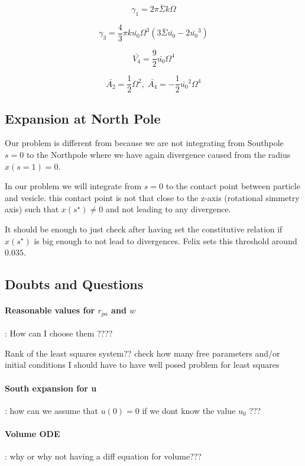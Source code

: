 \documentclass[12pt]{article}
\begin{document}
$$
\gamma_1 = 2 \pi \bar{\Sigma} k \Omega 
$$

$$
\gamma_3 = \frac{4}{3} \pi k \bar{u_0} \Omega^3 (3 \bar{\Sigma} \bar{u_0} - 2 \bar{u_0}^3)
$$


$$
\bar{V_4} = \frac{9}{2}\bar{u_0} \Omega^4
$$

$$
\bar{A_2} = \frac{1}{2} \Omega^2 ,\; \bar{A_4} = -\frac{1}{2} \bar{u_0}^2 \Omega^4
$$

\subsection{Expansion at North Pole}
Our problem is different from \cite{freyMembraneAreaGain2022} because we are not integrating from Southpole $s=0$ to the Northpole where we have again divergence caused from the radius $x(s=1)=0$.

In our problem we will integrate from $s=0$ to the contact point between particle and vesicle. this contact point is not that close to the z-axis (rotational simmetry axis) such that $x(s^\star)\neq 0$ and not leading to any divergence.

It should be enough to just check after having set the constitutive relation if $x(s^\star)$ is big enough to not lead to divergences. Felix sets this threshold around $0.035$.


\subsection{Doubts and Questions}
\paragraph{Reasonable values for $r_{pa}$ and $w$}:
How can I choose them ????


\alert{Rank of the least squares system??} check how many free parameters and/or initial conditions I should have to have well posed problem for least squares

\paragraph{South expansion for u}: how can we assume that $u(0)=0$ if we dont know the value $u_0$ ???

\paragraph{Volume ODE}: why or why not having a diff equation for volume???
\end{document}
